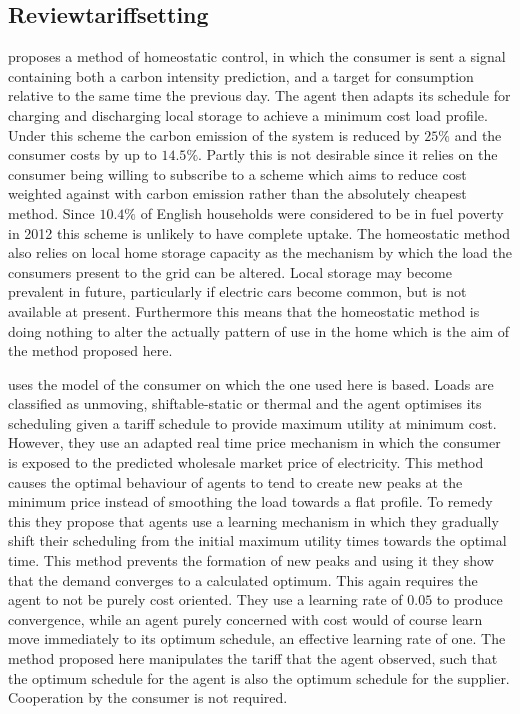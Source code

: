 \documentclass[a4paper, 10 pt, conference]{ieeeconf}  %
\begin{document}
\subsection{Reviewtariffsetting}

\cite{ramchurn2011agenthomeo} proposes a method of homeostatic control, in which the consumer is sent a signal containing both a carbon intensity prediction, and a target for consumption relative to the same time the previous day. The agent then adapts its schedule for charging and discharging local storage to achieve a minimum cost load profile. Under this scheme the carbon emission of the system is reduced by $25\%$ and the consumer costs by up to $14.5\%$. Partly this is not desirable since it relies on the consumer being willing to subscribe to a scheme which aims to reduce cost weighted against with carbon emission rather than the absolutely cheapest method. Since $10.4\%$ of English households were considered to be in fuel poverty in 2012 \cite{govfuelpov} this scheme is unlikely to have complete uptake. The homeostatic method also relies on local home storage capacity as the mechanism by which the load the consumers present to the grid can be altered. Local storage may become prevalent in future, particularly if electric cars become common, but is not available at present. Furthermore this means that the homeostatic method is doing nothing to alter the actually pattern of use in the home which is the aim of the method proposed here.

\cite{ramchurn2011agent} uses the model of the consumer on which the one used here is based. Loads are classified as unmoving, shiftable-static or thermal and the agent optimises its scheduling given a tariff schedule to provide maximum utility at minimum cost. However, they use an adapted real time price mechanism in which the consumer is exposed to the predicted wholesale market price of electricity. This method causes the optimal behaviour of agents to tend to create new peaks at the minimum price instead of smoothing the load towards a flat profile. To remedy this they propose that agents use a learning mechanism in which they gradually shift their scheduling from the initial maximum utility times towards the optimal time. This method prevents the formation of new peaks and using it they show that the demand converges to a calculated optimum. This again requires the agent to not be purely cost oriented. They use a learning rate of $0.05$ to produce convergence, while an agent purely concerned with cost would of course learn move immediately to its optimum schedule, an effective learning rate of one. The method proposed here manipulates the tariff that the agent observed, such that the optimum schedule for the agent is also the optimum schedule for the supplier. Cooperation by the consumer is not required.
\end{document}
